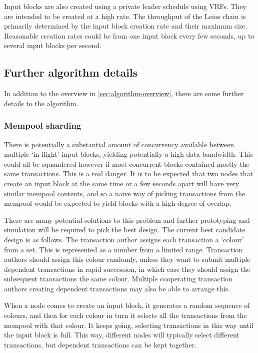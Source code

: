 \documentclass[11pt,a4paper]{article}
\begin{document}
Input blocks are also created using a private leader schedule using VRFs. They
are intended to be created at a high rate. The throughput of the Leios chain is
primarily determined by the input block creation rate and their maximum size.
Reasonable creation rates could be from one input block every few seconds, up
to several input blocks per second.

\subsection{Further algorithm details}

In addition to the overview in \cref{sec:algorithm-overview}, there are some
further details to the algorithm.

\subsubsection{Mempool sharding}
There is potentially a substantial amount of
concurrency available between multiple `in flight' input blocks, yielding
potentially a high data bandwidth. This could all be squandered however if most
concurrent blocks contained mostly the same transactions. This is a real danger.
It is to be expected that two nodes that create an input block at the same time
or a few seconds apart will have very similar mempool contents, and so a
na\"ive way of picking transactions from the mempool would be expected to
yield blocks with a high degree of overlap.

There are many potential solutions to this problem and further prototyping and
simulation will be required to pick the best design. The current best candidate
design is as follows. The transaction author assigns each transaction a `colour'
from a set. This is represented as a number from a limited range. Transaction
authors should assign this colour randomly, unless they want to submit multiple
dependent transactions in rapid succession, in which case they should assign
the subsequent transactions the same colour. Multiple cooperating transaction
authors creating dependent transactions may also be able to arrange this.

When a node comes to create an input block, it generates a random sequence of
colours, and then for each colour in turn it selects all the transactions from
the mempool with that colour. It keeps going, selecting transactions in this
way until the input block is full. This way, different nodes will typically
select different transactions, but dependent transactions can be kept together.
\end{document}
